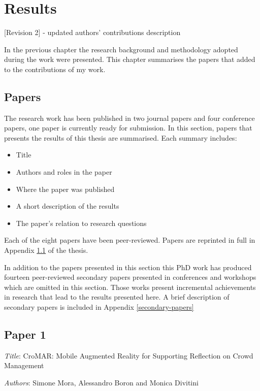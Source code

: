 \chapter{Results}\label{results}

{[}Revision 2{]} - updated authors' contributions description

In the previous chapter the research background and methodology adopted
during the work were presented. This chapter summarises the papers that
added to the contributions of my work.

\section{Papers}\label{papers}

The research work has been published in two journal papers and four
conference papers, one paper is currently ready for submission. In this
section, papers that presents the results of this thesis are summarised.
Each summary includes:

\begin{itemize}
\itemsep1pt\parskip0pt
\item
  Title
\item
  Authors and roles in the paper
\item
  Where the paper was published
\item
  A short description of the results
\item
  The paper's relation to research questions
\end{itemize}

Each of the eight papers have been peer-reviewed. Papers are reprinted
in full in Appendix \ref{papers} of the thesis.

In addition to the papers presented in this section this PhD work has
produced fourteen peer-reviewed secondary papers presented in
conferences and workshops which are omitted in this section. Those works
present incremental achievements in research that lead to the results
presented here. A brief description of secondary papers is included in
Appendix \ref{secondary-papers}

\section{Paper 1}\label{paper-1}

\emph{Title}: CroMAR: Mobile Augmented Reality for Supporting Reflection
on Crowd Management

\emph{Authors}: Simone Mora, Alessandro Boron and Monica Divitini

